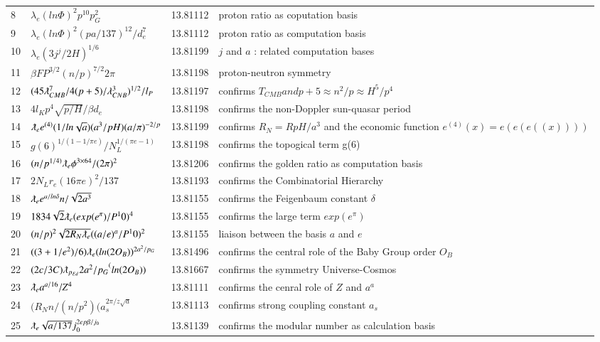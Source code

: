 \documentclass[a4paper,9pt]{article}
\begin{document}
\begin{appendix}
\begin{table}
\begin{tabular}{llll}
    8 & $    \lambda_{e} (ln\Phi)^2 p^{10} p_G^2 $ & 13.81112 & proton ratio as coputation basis \\
    9 & $    \lambda_{e} (ln\Phi)^2 (pa/137)^{12} /d_e^7 $ & 13.81112 & proton ratio as computation basis \\
   10 & $\lambda_{e} (3j^j/2H)^{1/6}$ & 13.81199 & $j$ and $a$ : related computation bases \\
   11 & $\beta F P^{3/2} (n/p)^{7/2} 2 \pi$ & 13.81198 & proton-neutron symmetry  \\ 
   12 & $(45\lambdabar_{CMB}^7/4(p+5)/\lambda_{CNB}^3)^{1/2}/l_P$ & 13.81197 & confirms $T_{CMB} and p+5 \approx n^2/p \approx H^5/p^4$\\
   13 & $4l_Kp^4 \sqrt{p/H}/\beta d_e$ & 13.81198 & confirms the non-Doppler sun-quasar period \\
   14 & $\lambdabar_{e} e^{(4)}(1/ln{\sqrt a}) (a^3/pH) (a/\pi)^{-2/p}   $ & 13.81199 & confirms $R_N = R pH/a^3$ and the economic function $e^{(4)}(x)= e(e(e((x))))$\\
   15 & $g(6)^{1/(1-1/\pi e)}/N_L^{1/(\pi e-1)}$ & 13.81198 & confirms the topogical term g(6) \\
   16 & $(n/p^{1/4)}  \lambdabar_{e} \phi ^{3\times 64}/(2\pi)^2   $ & 13.81206 & confirms the golden ratio as computation basis \\
   17 & $2 N_L r_e (16\pi e)^2/137  $ & 13.81193 & confirms the Combinatorial Hierarchy \\
   18 & $\lambdabar_{e} e^{a/ln\delta} n/\sqrt{2a^3}  $ & 13.81155 & confirms the Feigenbaum constant $\delta$ \\
   19 & $ 1834\sqrt 2 \lambdabar_{e} (exp(e^{\pi})/P^10)^4  $ & 13.81155 & confirms the large term $exp(e^{\pi})$ \\
   20 & $ (n/p)^2\sqrt {2R_N \lambdabar_{e}} ((a/e)^a/P^10)^2  $ & 13.81155 & liaison between the basis $a$ and $e$ \\
   21 & $((3+1/e^2)/6) \lambdabar_{e} (ln(2O_B))^{2a^2/p_G} $ & 13.81496 & confirms the central role of the Baby Group order $O_B$\\   
   22 & $ (2c/3C) \lambdabar_{p_{Ed}} {2a^2/p_G}^(ln(2O_B)) $ & 13.81667 & confirms the symmetry Universe-Cosmos\\ 
   23 & $\lambdabar_{e} a^{a/16} /Z^4$ & 13.81111 & confirms the cenral role of $Z$ and $a^a$\\
   24 & $(R_N n/ (n/p^2) (a_s^{2\pi/z\sqrt a}$ & 13.81113 & confirms strong coupling constant $a_s$\\
   25 & $ \lambdabar_{e} \sqrt{a/137} j_0^{2ep\beta/j_0}$ & 13.81139 & confirms the modular number as calculation basis\\ 

\end{tabular}
\end{table}
\end{appendix}
\end{document}
